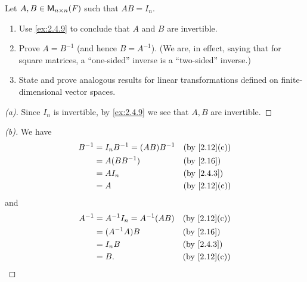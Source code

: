 \begin{ex}\label{ex:2.4.10}
	Let \(A, B \in \mathsf{M}_{{n} \times n}({\mathit{F}})\) such that \(AB = I_n\).
	\begin{enumerate}
		\item Use \cref{ex:2.4.9} to conclude that \(A\) and \(B\) are invertible.
		\item Prove \(A = B^{-1}\) (and hence \(B = A^{-1}\)).
		      (We are, in effect, saying that for square matrices, a ``one-sided'' inverse is a ``two-sided'' inverse.)
		\item State and prove analogous results for linear transformations defined on finite-dimensional vector spaces.
	\end{enumerate}
\end{ex}

\begin{proof}[(a)]
	Since \(I_n\) is invertible, by \cref{ex:2.4.9} we see that \(A, B\) are invertible.
\end{proof}

\begin{proof}[(b)]
	We have
	\begin{align*}
		B^{-1} & = I_n B^{-1} = (AB) B^{-1} &  & \by{2.12}[c] \\
		       & = A (B B^{-1})             &  & \by{2.16}    \\
		       & = A I_n                    &  & \by{2.4.3}   \\
		       & = A                        &  & \by{2.12}[c]
	\end{align*}
	and
	\begin{align*}
		A^{-1} & = A^{-1} I_n = A^{-1} (AB) &  & \by{2.12}[c] \\
		       & = (A^{-1} A) B             &  & \by{2.16}    \\
		       & = I_n B                    &  & \by{2.4.3}   \\
		       & = B.                       &  & \by{2.12}[c]
	\end{align*}
\end{proof}


